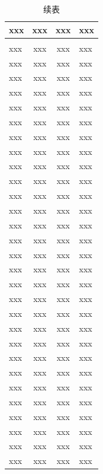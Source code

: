 
\setlength{\headheight}{13pt}

\songti{} 

\begin{longtable}{@{\extracolsep{\fill}} l c c l @{}} %
  \caption{XXXXXXX}\label{Appendix1}\\[-5pt]
  \toprule
  xxx &	xxx	& xxx & xxx \\ 
  \midrule
  \endfirsthead 
  \caption{续表} \\[-5pt]
  \toprule
  \endhead
  \bottomrule
  \endfoot 
  \bottomrule
  \endlastfoot 
    xxx & xxx & xxx & xxx \\
    xxx & xxx & xxx & xxx \\
    xxx & xxx & xxx & xxx \\
    xxx & xxx & xxx & xxx \\
    xxx & xxx & xxx & xxx \\
    xxx & xxx & xxx & xxx \\
    xxx & xxx & xxx & xxx \\
    xxx & xxx & xxx & xxx \\
    xxx & xxx & xxx & xxx \\
    xxx & xxx & xxx & xxx \\
    xxx & xxx & xxx & xxx \\
    xxx & xxx & xxx & xxx \\
    xxx & xxx & xxx & xxx \\
    xxx & xxx & xxx & xxx \\
    xxx & xxx & xxx & xxx \\
    xxx & xxx & xxx & xxx \\
    xxx & xxx & xxx & xxx \\
    xxx & xxx & xxx & xxx \\
    xxx & xxx & xxx & xxx \\
    xxx & xxx & xxx & xxx \\
    xxx & xxx & xxx & xxx \\
    xxx & xxx & xxx & xxx \\
    xxx & xxx & xxx & xxx \\
    xxx & xxx & xxx & xxx \\
    xxx & xxx & xxx & xxx \\
    xxx & xxx & xxx & xxx \\
    xxx & xxx & xxx & xxx \\
    xxx & xxx & xxx & xxx \\
    xxx & xxx & xxx & xxx \\

\end{longtable}
